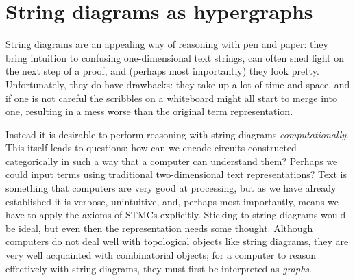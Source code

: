\chapter{String diagrams as hypergraphs}

String diagrams are an appealing way of reasoning with pen and paper: they bring
intuition to confusing one-dimensional text strings, can often shed light on the
next step of a proof, and (perhaps most importantly) they look pretty.
Unfortunately, they do have drawbacks: they take up a lot of time and space, and
if one is not careful the scribbles on a whiteboard might all start to merge
into one, resulting in a mess worse than the original term representation.

Instead it is desirable to perform reasoning with string diagrams
\emph{computationally}.
This itself leads to questions: how can we encode circuits constructed
categorically in such a way that a computer can understand them?
Perhaps we could input terms using traditional two-dimensional text
representations?
Text is something that computers are very good at processing, but as we have
already established it is verbose, unintuitive, and, perhaps most importantly,
means we have to apply the axioms of STMCs explicitly.
Sticking to string diagrams would be ideal, but even then the representation
needs some thought.
Although computers do not deal well with topological objects like string
diagrams, they are very well acquainted with combinatorial objects; for
a computer to reason effectively with string diagrams, they must first be
interpreted as \emph{graphs}.








